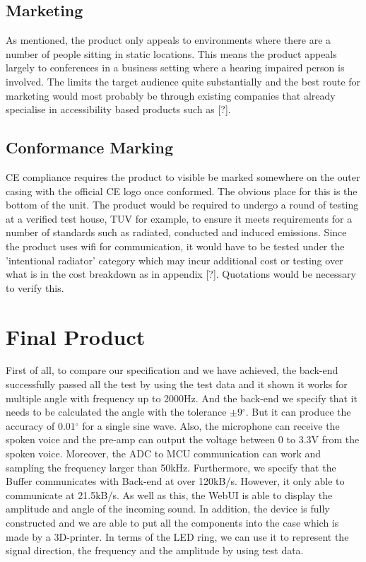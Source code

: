 \documentclass[a4paper]{article}
\begin{document}
\subsection{Marketing}
As mentioned, the product only appeals to environments where there are a number
of people sitting in static locations. This means the product appeals largely to
conferences in a business setting where a hearing impaired person is involved.
The limits the target audience quite substantially and the best route for
marketing would most probably be through existing companies that already
specialise in accessibility based products such as [?].

\subsection{Conformance Marking}
CE compliance requires the product to visible be marked somewhere on the outer
casing with the official CE logo once conformed. The obvious place for this is
the bottom of the unit. The product would be required to undergo a round of
testing at a verified test house, TUV for example, to ensure it meets
requirements for a number of standards such as radiated, conducted and induced
emissions. Since the product uses wifi for communication, it would have to be
tested under the 'intentional radiator' category which may incur additional cost
or testing over what is in the cost breakdown as in appendix [?]. Quotations
would be necessary to verify this.


\section{Final Product}

First of all, to compare our specification and we have achieved, the back-end
successfully passed all the test by using the test data and it shown it works
for multiple angle with frequency up to 2000Hz. And the back-end we specify that
it needs to be calculated the angle with the tolerance \(\pm 9{^\circ}\). But it
can produce the accuracy of \(0.01{^\circ}\) for a single sine wave. Also, the
microphone can receive the spoken voice and the pre-amp can output the voltage
between 0 to 3.3V from the spoken voice. Moreover, the ADC to MCU communication
can work and sampling the frequency larger than 50kHz. Furthermore, we specify
that the Buffer communicates with Back-end at over 120kB/s.  However, it only
able to communicate at 21.5kB/s. As well as this, the WebUI is able to display
the amplitude and angle of the incoming sound.  In addition, the device is fully
constructed and we are able to put all the components into the case which is
made by a 3D-printer. In terms of the LED ring, we can use it to represent the
signal direction, the frequency and the amplitude by using test data.
\end{document}

